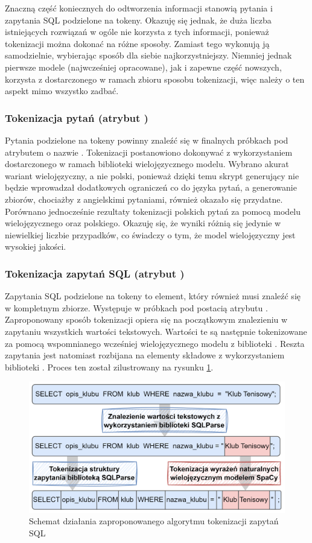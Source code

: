 Znaczną część koniecznych do odtworzenia informacji stanowią pytania i zapytania SQL podzielone na tokeny. Okazuję się jednak, że duża liczba istniejących rozwiązań w ogóle nie korzysta z tych informacji, ponieważ tokenizacji można dokonać na różne sposoby. Zamiast tego wykonują ją samodzielnie, wybierając sposób dla siebie najkorzystniejszy. Niemniej jednak pierwsze modele (najwcześniej opracowane), jak i zapewne część nowszych, korzysta z dostarczonego w ramach zbioru sposobu tokenizacji, więc należy o ten aspekt mimo wszystko zadbać.

\subsubsection{Tokenizacja pytań (atrybut )}
Pytania podzielone na tokeny powinny znaleźć się w finalnych próbkach pod atrybutem o nazwie . Tokenizacji postanowiono dokonywać z wykorzystaniem dostarczonego w ramach biblioteki  wielojęzycznego modelu. Wybrano akurat wariant wielojęzyczny, a nie polski, ponieważ dzięki temu skrypt generujący nie będzie wprowadzał dodatkowych ograniczeń co do języka pytań, a generowanie zbiorów, chociażby z angielskimi pytaniami, również okazało się przydatne. Porównano jednocześnie rezultaty tokenizacji polskich pytań za pomocą modelu wielojęzycznego oraz polskiego. Okazuję się, że wyniki różnią się jedynie w niewielkiej liczbie przypadków, co świadczy o tym, że model wielojęzyczny jest wysokiej jakości.

\subsubsection{Tokenizacja zapytań SQL (atrybut )}
Zapytania SQL podzielone na tokeny to element, który również musi znaleźć się w kompletnym zbiorze. Występuje w próbkach pod postacią atrybutu . Zaproponowany sposób tokenizacji opiera się na początkowym znalezieniu w zapytaniu wszystkich wartości tekstowych. Wartości te są następnie tokenizowane za pomocą wspomnianego wcześniej wielojęzycznego modelu z biblioteki . Reszta zapytania jest natomiast rozbijana na elementy składowe z wykorzystaniem biblioteki . Proces ten został zilustrowany na rysunku \ref{fig:query-tokenization}.

\begin{figure}[ht!]
  \centering
  \includegraphics[width=0.9\linewidth]{images/query_tokenization.png}
  \caption{Schemat działania zaproponowanego algorytmu tokenizacji zapytań SQL}
  \label{fig:query-tokenization}
\end{figure}

